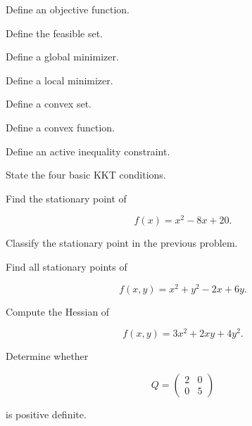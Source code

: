 \begin{exercise}[1]
Define an objective function.
\end{exercise}

\begin{exercise}[1]
Define the feasible set.
\end{exercise}

\begin{exercise}[1]
Define a global minimizer.
\end{exercise}

\begin{exercise}[1]
Define a local minimizer.
\end{exercise}

\begin{exercise}[1]
Define a convex set.
\end{exercise}

\begin{exercise}[1]
Define a convex function.
\end{exercise}

\begin{exercise}[1]
Define an active inequality constraint.
\end{exercise}

\begin{exercise}[1]
State the four basic KKT conditions.
\end{exercise}

\begin{exercise}[2]
Find the stationary point of

\[
f(x)=x^2-8x+20.
\]
\end{exercise}

\begin{exercise}[2]
Classify the stationary point in the previous problem.
\end{exercise}

\begin{exercise}[2]
Find all stationary points of

\[
f(x,y)
=
x^2+y^2-2x+6y.
\]
\end{exercise}

\begin{exercise}[2]
Compute the Hessian of

\[
f(x,y)
=
3x^2+2xy+4y^2.
\]
\end{exercise}

\begin{exercise}[2]
Determine whether

\[
Q
=
\begin{pmatrix}
2&0\\
0&5
\end{pmatrix}
\]

is positive definite.
\end{exercise}

